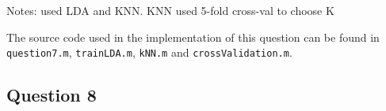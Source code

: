 \documentclass[a4paper, 11pt]{article}
\begin{document}
Notes: used LDA and KNN\@. KNN used 5-fold cross-val to choose K

The source code used in the implementation of this question can be found in \texttt{question7.m}, \texttt{trainLDA.m}, \texttt{kNN.m} and \texttt{crossValidation.m}.

\subsection*{Question 8} %

\end{document}
